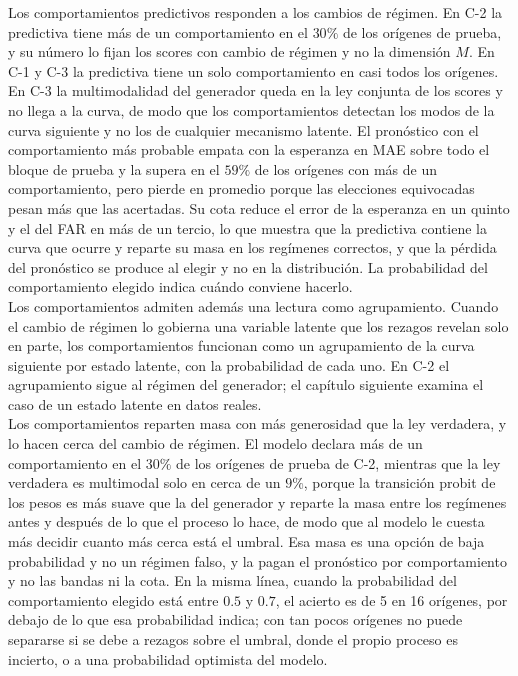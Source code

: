 Los comportamientos predictivos responden a los cambios de régimen. En C-2 la predictiva tiene más de un comportamiento en el $30\%$ de los orígenes de prueba, y su número lo fijan los scores con cambio de régimen y no la dimensión $M$. En C-1 y C-3 la predictiva tiene un solo comportamiento en casi todos los orígenes. En C-3 la multimodalidad del generador queda en la ley conjunta de los scores y no llega a la curva, de modo que los comportamientos detectan los modos de la curva siguiente y no los de cualquier mecanismo latente. El pronóstico con el comportamiento más probable empata con la esperanza en MAE sobre todo el bloque de prueba y la supera en el $59\%$ de los orígenes con más de un comportamiento, pero pierde en promedio porque las elecciones equivocadas pesan más que las acertadas. Su cota reduce el error de la esperanza en un quinto y el del FAR en más de un tercio, lo que muestra que la predictiva contiene la curva que ocurre y reparte su masa en los regímenes correctos, y que la pérdida del pronóstico se produce al elegir y no en la distribución. La probabilidad del comportamiento elegido indica cuándo conviene hacerlo.\\

Los comportamientos admiten además una lectura como agrupamiento. Cuando el cambio de régimen lo gobierna una variable latente que los rezagos revelan solo en parte, los comportamientos funcionan como un agrupamiento de la curva siguiente por estado latente, con la probabilidad de cada uno. En C-2 el agrupamiento sigue al régimen del generador; el capítulo siguiente examina el caso de un estado latente en datos reales.\\

Los comportamientos reparten masa con más generosidad que la ley verdadera, y lo hacen cerca del cambio de régimen. El modelo declara más de un comportamiento en el $30\%$ de los orígenes de prueba de C-2, mientras que la ley verdadera es multimodal solo en cerca de un $9\%$, porque la transición probit de los pesos es más suave que la del generador y reparte la masa entre los regímenes antes y después de lo que el proceso lo hace, de modo que al modelo le cuesta más decidir cuanto más cerca está el umbral. Esa masa es una opción de baja probabilidad y no un régimen falso, y la pagan el pronóstico por comportamiento y no las bandas ni la cota. En la misma línea, cuando la probabilidad del comportamiento elegido está entre $0.5$ y $0.7$, el acierto es de 5 en 16 orígenes, por debajo de lo que esa probabilidad indica; con tan pocos orígenes no puede separarse si se debe a rezagos sobre el umbral, donde el propio proceso es incierto, o a una probabilidad optimista del modelo.\\

